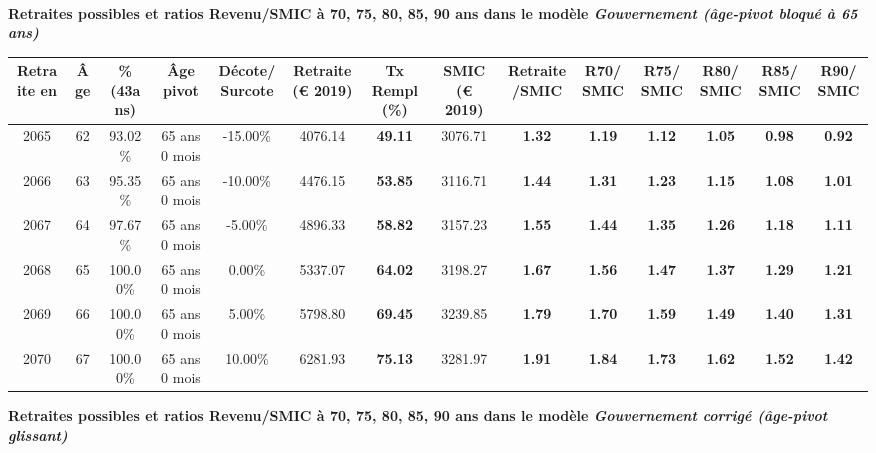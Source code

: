  ~\\{\bf \noindent Retraites possibles et ratios Revenu/SMIC à 70, 75, 80, 85, 90 ans dans le modèle \emph{Gouvernement (âge-pivot bloqué à 65 ans)}}  
 
\begin{adjustbox}{max width=\textwidth} 
\begin{tabular}[htb]{|c|c||c|c|c||c|c||c|c||c|c|c|c|c|} 
\hline 
 Retraite en &  Âge &  \%(43ans) &  Âge pivot &  Décote/Surcote &  Retraite (\euro{} 2019) &  Tx Rempl(\%) &  SMIC (\euro{} 2019) &  Retraite/SMIC &  R70/SMIC &  R75/SMIC &  R80/SMIC &  R85/SMIC &  R90/SMIC \\ 
\hline \hline 
 2065 &  62 &  93.02\% &  65 ans 0 mois &  -15.00\% &  4076.14 &  {\bf 49.11} &  3076.71 &  {\bf 1.32} &  {\bf 1.19} &  {\bf 1.12} &  {\bf 1.05} &  {\bf {\color{red} 0.98}} &  {\bf {\color{red} 0.92}} \\ 
\hline 
 2066 &  63 &  95.35\% &  65 ans 0 mois &  -10.00\% &  4476.15 &  {\bf 53.85} &  3116.71 &  {\bf 1.44} &  {\bf 1.31} &  {\bf 1.23} &  {\bf 1.15} &  {\bf 1.08} &  {\bf 1.01} \\ 
\hline 
 2067 &  64 &  97.67\% &  65 ans 0 mois &  -5.00\% &  4896.33 &  {\bf 58.82} &  3157.23 &  {\bf 1.55} &  {\bf 1.44} &  {\bf 1.35} &  {\bf 1.26} &  {\bf 1.18} &  {\bf 1.11} \\ 
\hline 
 2068 &  65 &  100.00\% &  65 ans 0 mois &  0.00\% &  5337.07 &  {\bf 64.02} &  3198.27 &  {\bf 1.67} &  {\bf 1.56} &  {\bf 1.47} &  {\bf 1.37} &  {\bf 1.29} &  {\bf 1.21} \\ 
\hline 
 2069 &  66 &  100.00\% &  65 ans 0 mois &  5.00\% &  5798.80 &  {\bf 69.45} &  3239.85 &  {\bf 1.79} &  {\bf 1.70} &  {\bf 1.59} &  {\bf 1.49} &  {\bf 1.40} &  {\bf 1.31} \\ 
\hline 
 2070 &  67 &  100.00\% &  65 ans 0 mois &  10.00\% &  6281.93 &  {\bf 75.13} &  3281.97 &  {\bf 1.91} &  {\bf 1.84} &  {\bf 1.73} &  {\bf 1.62} &  {\bf 1.52} &  {\bf 1.42} \\ 
\hline 
\hline 
\end{tabular} 
\end{adjustbox} 
 
 \vspace{0.1cm} 
{\bf \noindent Retraites possibles et ratios Revenu/SMIC à 70, 75, 80, 85, 90 ans dans le modèle \emph{Gouvernement corrigé (âge-pivot glissant)}}  
 

